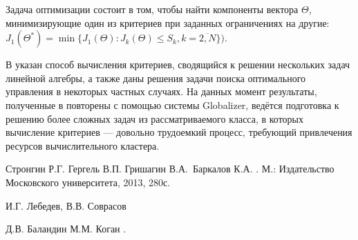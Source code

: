 \documentclass[11pt, oneside, a4paper]{article}
\begin{document}
Задача оптимизации состоит в том, чтобы найти компоненты вектора \(\Theta\), минимизирующие
один из критериев при заданных ограничениях на другие: \(J_1(\Theta^*)=\min\{J_1(\Theta):J_k(\Theta)\le S_k,k=\overline{2,N}\})\).

В \cite{optControl} указан способ вычисления критериев, сводящийся к решении нескольких задач линейной алгебры,
а также даны решения задачи поиска оптимального управления в некоторых частных случаях. На данных момент результаты,
полученные в \cite{optControl} повторены с помощью системы Globalizer, ведётся
подготовка к решению более сложных задач из рассматриваемого класса, в которых вычисление критериев --- довольно
трудоемкий процесс, требующий привлечения ресурсов вычислительного кластера.

\begin{biblio}

Стронгин Р.Г. Гергель В.П. Гришагин
  В.А.~Баркалов К.А.
.
\newblock М.: Издательство Московского
  университета, 2013, 280с.

 И.Г. Лебедев, В.В. Соврасов

 Д.В. Баландин М.М. Коган
 .

\end{biblio}
\end{document}
